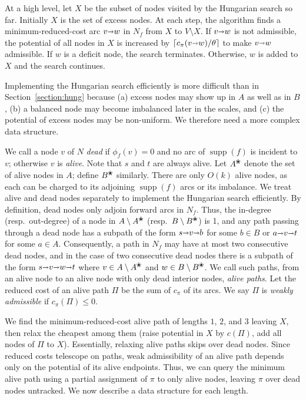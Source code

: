 \documentclass[a4paper,UKenglish]{socg-lipics-v2019}
\def\polylog{\mathop{\mathrm{polylog}}}
\def\Ceil#1{\left\lceil #1 \right\rceil}
\def\fsupply{\phi}
\def\arcto{\mathord\shortrightarrow}
\def\arc#1#2{#1\arcto#2}
\def\supp{\operatorname{supp}}
\def\alive#1{{#1}^\text{\ding{96}}}
\def\dead#1{{#1} \setminus \alive{#1}}
\theoremstyle{plain}
\numberwithin{figure}{section}
\def\EMPH#1{\textcolor{BrickRed}{{\emph{#1}}}}
\begin{document}
At a high level, let \EMPH{$X$} be the subset of nodes visited by the Hungarian search
so far.
Initially $X$ is the set of excess nodes.
At each step, the algorithm finds a minimum-reduced-cost arc $\arc vw$ in $N_f$
from $X$ to $V \setminus X$.
If $\arc vw$ is not admissible, the potential of all nodes in $X$ is increased
by $\Ceil{c_\pi(\arc vw)/\theta}$ to make $\arc vw$ admissible.
If $w $ is a deficit node, the search terminates.
Otherwise, $w$ is added to $X$ and the search continues.

Implementing the Hungarian search efficiently is more difficult than in
Section~\ref{section:hung} because (a) excess nodes may show up in $A$ as well as in $B$,
(b) a balanced node may become imbalanced later in the scales,
and (c) the potential of excess nodes may be non-uniform.
We therefore need a more complex data structure.

We call a node $v$ of $N$ \EMPH{dead} if $\fsupply_f(v) = 0$ and no arc of
$\supp(f)$ is incident to $v$; otherwise $v$ is \EMPH{alive}.
Note that $s$ and $t$ are always alive.
Let \EMPH{$\alive{A}$} denote the set of alive nodes in $A$; define \EMPH{$\alive{B}$} similarly.
There are only $O(k)$ alive nodes, as each can be charged to its
adjoining $\supp(f)$ arcs or its imbalance.
We treat alive and dead nodes separately to implement the Hungarian search
efficiently.
By definition, dead nodes only adjoin forward arcs in $N_f$.
Thus, the in-degree (resp.\ out-degree) of a node in $\dead{A}$ (resp.\ $\dead{B}$)
is 1, and any path passing through a dead node has a subpath of the form
$s \arcto v \arcto b$ for some $b \in B$ or $a \arcto v \arcto t$ for some $a \in A$.
Consequently, a path in $N_f$ may have at most two consecutive dead nodes,
and in the case of two consecutive dead nodes there is a subpath of the
form $s \arcto v \arcto w \arcto t$ where $v \in \dead{A}$ and $w \in \dead{B}$.
We call such paths, from an alive node to an alive node
with only dead interior nodes, \EMPH{alive paths}.
Let the reduced cost of an alive path $\Pi$ be the sum of $c_\pi$ of its arcs.
We say $\Pi$ is \EMPH{weakly admissible} if $c_\pi(\Pi) \leq 0$.

We find the minimum-reduced-cost alive path of lengths $1$, $2$, and $3$
leaving $X$, then relax the cheapest among them (raise potential in $X$ by $c(\Pi)$,
add all nodes of $\Pi$ to $X$).
Essentially, relaxing alive paths skips over dead nodes.
Since reduced costs telescope on paths, weak admissibility of an alive path
depends only on the potential of its alive endpoints.
Thus, we can query the minimum alive path using a partial assignment
of $\pi$ to only alive nodes, leaving $\pi$ over dead nodes untracked.
We now describe a data structure for each length.
\end{document}
